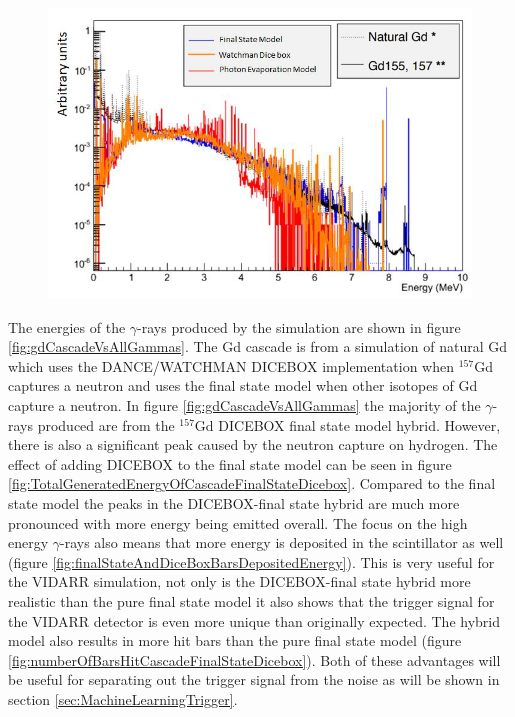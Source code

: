 \begin{figure}[!h]
 \centering
 \includegraphics[width=0.7\linewidth]{Chapter4/Figs/Raster/gadolinium/comparisonAndDiceBoxGd.png}
 \label{fig:comparisonAndDiceBoxGd}
\end{figure}

The energies of the $\gamma$-rays produced by the simulation are shown in figure \ref{fig:gdCascadeVsAllGammas}. The Gd cascade is from a simulation of natural Gd which uses the DANCE/WATCHMAN DICEBOX implementation when $^{157}$Gd captures a neutron and uses the final state model when other isotopes of Gd capture a neutron. In figure \ref{fig:gdCascadeVsAllGammas} the majority of the $\gamma$-rays produced are from the $^{157}$Gd DICEBOX final state model hybrid. However, there is also a significant peak caused by the neutron capture on hydrogen. The effect of adding DICEBOX to the final state model can be seen in figure \ref{fig:TotalGeneratedEnergyOfCascadeFinalStateDicebox}. Compared to the final state model the peaks in the DICEBOX-final state hybrid are much more pronounced with more energy being emitted overall. The focus on the high energy $\gamma$-rays also means that more energy is deposited in the scintillator as well (figure \ref{fig:finalStateAndDiceBoxBarsDepositedEnergy}). This is very useful for the VIDARR simulation, not only is the DICEBOX-final state hybrid more realistic than the pure final state model it also shows that the trigger signal for the VIDARR detector is even more unique than originally expected. The hybrid model also results in more hit bars than the pure final state model (figure \ref{fig:numberOfBarsHitCascadeFinalStateDicebox}). Both of these advantages will be useful for separating out the trigger signal from the noise as will be shown in section \ref{sec:MachineLearningTrigger}.

